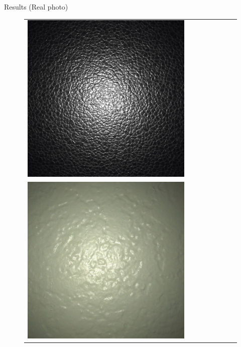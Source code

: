 \documentclass[final]{beamer}
\newlength{\twocolwid}
\newlength{\resultwidth}
\begin{document}
\begin{frame}[t]
\begin{columns}[t]
\begin{column}{\twocolwid}
\begin{block}{Results (Real photo)}
\begin{figure}[t]
\begin{tabular}{ccrclccc}
            		\includegraphics[width=\resultwidth]{real/leather/bad1.jpg}
            		\\
            		\includegraphics[width=\resultwidth]{real/plaster/target.jpg} &

\end{tabular}
\end{figure}
\end{block}
\end{column}
\end{columns}
\end{frame}
\end{document}

